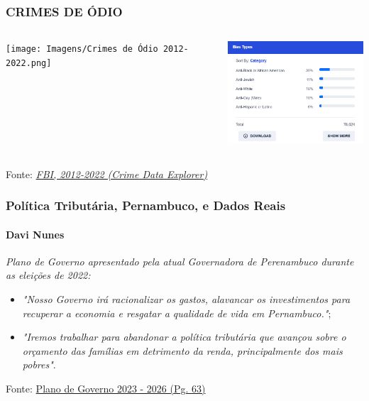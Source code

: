\documentclass[compress,12pt]{beamer}
\begin{document}
\begin{frame}
    \frametitle{CRIMES DE ÓDIO}
    \begin{columns}
    
        \centering
        
        \texttt{[image: Imagens/Crimes de Ódio 2012-2022.png]}
        
        \centering
        
        \includegraphics[width=56mm]{Imagens/Hate Crime Bias.png}
    \end{columns}

    
    \centering
    Fonte: \href{https://cde.ucr.cjis.gov/LATEST/webapp/#/pages/explorer/crime/hate-crime}{\textit{FBI, 2012-2022 (Crime Data Explorer)}}
\end{frame}

\begin{frame}[bg=Imagens/fascists.png]
\end{frame}


\begin{frame}
    \frametitle{Política Tributária, Pernambuco, e Dados Reais}
    \framesubtitle{Davi Nunes}
    \textit{Plano de Governo apresentado pela atual Governadora de Perenambuco durante as eleições de 2022:}
    \begin{itemize}
        \item \textit{"Nosso Governo irá racionalizar os gastos, alavancar os investimentos para recuperar a economia e resgatar a qualidade de vida em Pernambuco."};
        \item \textit{"Iremos trabalhar para abandonar a política tributária que avançou sobre o orçamento das famílias em detrimento da renda, principalmente dos mais pobres"}.
        \newline
        \newline
    \end{itemize}
    \centering
    Fonte: \href{https://static.poder360.com.br/2022/10/Plano-de-governo-Raquel-Lyra.pdf}{Plano de Governo 2023 - 2026 (Pg. 63)}
\end{frame}
\end{document}
